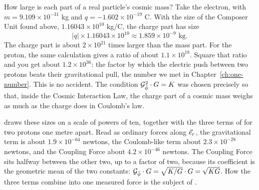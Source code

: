 \begin{workedexample}
How large is each part of a real particle's cosmic mass? Take the electron, with $m = 9.109 \times 10^{-31}$ kg and $q = -1.602 \times 10^{-19}$ C. With the size of the Composer Unit found above, $1.16043 \times 10^{10}$ kg/C, the charge part has size
\[
|q| \times 1.16043 \times 10^{10} \approx 1.859 \times 10^{-9} \text{ kg}.
\]
The charge part is about $2 \times 10^{21}$ times larger than the mass part. For the proton, the same calculation gives a ratio of about $1.1 \times 10^{18}$. Square that ratio and you get about $1.2 \times 10^{36}$: the factor by which the electric push between two protons beats their gravitational pull, the number we met in Chapter~\ref{ch:one-number}. This is no accident. The condition $\mathcal{G}_{\bar{\phi}}^2 \cdot G = K$ was chosen precisely so that, inside the Cosmic Interaction Law, the charge part of a cosmic mass weighs as much as the charge does in Coulomb's law.

 draws these sizes on a scale of powers of ten, together with the three terms of  for two protons one metre apart. Read as ordinary forces along $\vec{e}_r$, the gravitational term is about $1.9 \times 10^{-64}$ newtons, the Coulomb-like term about $2.3 \times 10^{-28}$ newtons, and the Coupling Force about $4.2 \times 10^{-46}$ newtons. The Coupling Force sits halfway between the other two, up to a factor of two, because its coefficient is the geometric mean of the two constants: $\mathcal{G}_{\bar{\phi}} \cdot G = \sqrt{K/G} \cdot G = \sqrt{KG}$. How the three terms combine into one measured force is the subject of .
\end{workedexample}

